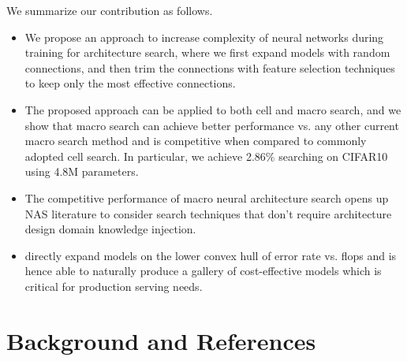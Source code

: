 We summarize our contribution as follows.
\begin{itemize}
\item We propose an approach to increase complexity of neural networks during training for architecture search, where we first expand models with random connections, and then trim the connections with feature selection techniques to keep only the most effective connections. 
\item The proposed approach can be applied to both cell and macro search, and we show that macro search can achieve better performance vs. any other current macro search method and is competitive when compared to commonly adopted cell search. In particular, we achieve 2.86\% searching on CIFAR10 using 4.8M parameters.
\item The competitive performance of \Petridish macro neural architecture search opens up NAS literature to consider search techniques that don't require architecture design domain knowledge injection.
\item \Petridish directly expand models on the lower convex hull of error rate vs. flops and is hence able to naturally produce a gallery of cost-effective models which is critical for production serving needs. 
\end{itemize}


\section{Background and References}

